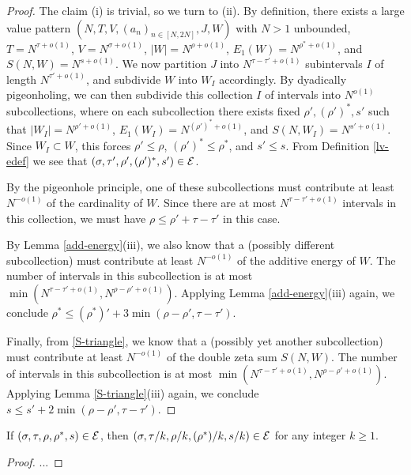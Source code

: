 \begin{proof}  The claim (i) is trivial, so we turn to (ii).  By definition, there exists a large value pattern $(N,T,V,(a_n)_{n \in [N,2N]},J,W)$ with $N > 1$ unbounded, $T = N^{\tau+o(1)}$, $V = N^{\sigma+o(1)}$, $|W| = N^{\rho+o(1)}$, $E_1(W) = N^{\rho^*+o(1)}$, and $S(N,W) = N^{s+o(1)}$.  We now partition $J$ into $N^{\tau-\tau'+o(1)}$ subintervals $I$ of length $N^{\tau'+o(1)}$, and subdivide $W$ into $W_I$ accordingly.  By dyadically pigeonholing, we can then subdivide this collection $I$ of intervals into $N^{o(1)}$ subcollections, where on each subcollection there exists fixed $\rho', (\rho')^*, s'$ such that $|W_I| = N^{\rho'+o(1)}$, $E_1(W_I) = N^{(\rho')^* + o(1)}$, and $S(N,W_I) = N^{s'+o(1)}$.  Since $W_I \subset W$, this forces $\rho' \leq \rho$, $(\rho')^* \leq \rho^*$, and $s' \leq s$.  From Definition \ref{lv-edef} we see that $(\sigma,\tau', \rho', (\rho')^*,s') \in \mathcal{E}$.

By the pigeonhole principle, one of these subcollections must contribute at least $N^{-o(1)}$ of the cardinality of $W$.  Since there are at most $N^{\tau-\tau'+o(1)}$ intervals in this collection, we must have $\rho \leq \rho' + \tau - \tau'$ in this case.

By Lemma \ref{add-energy}(iii), we also know that a (possibly different subcollection) must contribute at least $N^{-o(1)}$ of the additive energy of $W$.  The number of intervals in this subcollection is at most $\min( N^{\tau-\tau'+o(1)}, N^{\rho-\rho'+o(1)})$.  Applying Lemma \ref{add-energy}(iii) again, we conclude $\rho^* \leq (\rho^*)' + 3\min(\rho-\rho',\tau-\tau')$.

Finally, from \eqref{S-triangle}, we know that a (possibly yet another subcollection) must contribute at least $N^{-o(1)}$ of the double zeta sum $S(N,W)$. The number of intervals in this subcollection is at most $\min( N^{\tau-\tau'+o(1)}, N^{\rho-\rho'+o(1)})$.  Applying Lemma \ref{S-triangle}(iii) again, we conclude $s \leq s' + 2\min(\rho-\rho',\tau-\tau')$.
\end{proof}


\begin{lemma}\label{power-energy}  If $(\sigma,\tau,\rho,\rho^*,s) \in \mathcal{E}$, then $(\sigma,\tau/k, \rho/k, (\rho^*)/k,s/k) \in \mathcal{E}$ for any integer $k \geq 1$.
\end{lemma}

\begin{proof}
    ...
\end{proof}

